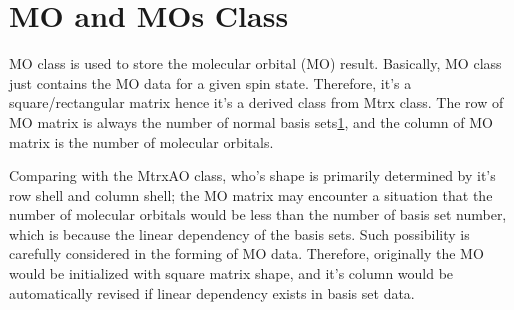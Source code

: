 \section{MO and MOs Class}
%
%

MO class is used to store the molecular orbital (MO) result. Basically, MO
class just contains the MO data for a given spin state. Therefore, it's a 
square/rectangular matrix hence it's a derived class from Mtrx class. The 
row of MO matrix is always the number of normal basis sets\ref{}, and the 
column of MO matrix is the number of molecular orbitals.

Comparing with the MtrxAO class, who's shape is primarily determined by it's 
row shell and column shell; the MO matrix may encounter a situation that 
the number of molecular orbitals would be less than the number of basis
set number, which is because the linear dependency of the basis sets.
Such possibility is carefully considered in the forming of MO data. Therefore,
originally the MO would be initialized with square matrix shape, and it's column
would be automatically revised if linear dependency exists in basis set data.



